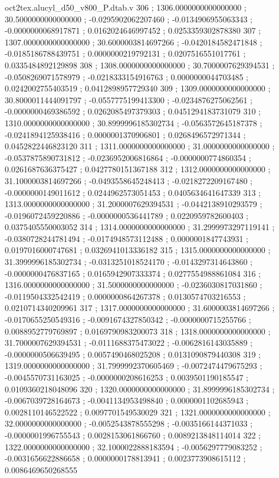 \begin{filecontents}[overwrite]{oct2tex.alucyl_d50_v800_P.dtab.v}
306 ; 1306.0000000000000000 ; 30.5000000000000000 ; -0.0295902062207460 ; -0.0134906955063343 ; -0.0000000068917871 ; 0.0162024646997452 ; 0.0253359302878380
307 ; 1307.0000000000000000 ; 30.6000003814697266 ; -0.0420184582471848 ; -0.0185186788439751 ; 0.0000000219792131 ; 0.0207516551017761 ; 0.0335484892129898
308 ; 1308.0000000000000000 ; 30.7000007629394531 ; -0.0508269071578979 ; -0.0218333154916763 ; 0.0000000044703485 ; 0.0242002755403519 ; 0.0412898957729340
309 ; 1309.0000000000000000 ; 30.8000011444091797 ; -0.0557775199413300 ; -0.0234876275062561 ; -0.0000000469386592 ; 0.0262085497379303 ; 0.0451294183731079
310 ; 1310.0000000000000000 ; 30.8999996185302734 ; -0.0563572645187378 ; -0.0241894125938416 ; 0.0000001370906801 ; 0.0268496572971344 ; 0.0452822446823120
311 ; 1311.0000000000000000 ; 31.0000000000000000 ; -0.0537875890731812 ; -0.0236952006816864 ; -0.0000000774860354 ; 0.0261687636375427 ; 0.0427780151367188
312 ; 1312.0000000000000000 ; 31.1000003814697266 ; -0.0493558645248413 ; -0.0218272209167480 ; -0.0000000149011612 ; 0.0244962573051453 ; 0.0405634641647339
313 ; 1313.0000000000000000 ; 31.2000007629394531 ; -0.0442138910293579 ; -0.0196072459220886 ; -0.0000000536441789 ; 0.0220959782600403 ; 0.0375405550003052
314 ; 1314.0000000000000000 ; 31.2999973297119141 ; -0.0380728244781494 ; -0.0174948573112488 ; 0.0000001847743931 ; 0.0197016000747681 ; 0.0326941013336182
315 ; 1315.0000000000000000 ; 31.3999996185302734 ; -0.0313251018524170 ; -0.0143297314643860 ; -0.0000000476837165 ; 0.0165942907333374 ; 0.0277554988861084
316 ; 1316.0000000000000000 ; 31.5000000000000000 ; -0.0236030817031860 ; -0.0119504332542419 ; 0.0000000864267378 ; 0.0130574703216553 ; 0.0210714340209961
317 ; 1317.0000000000000000 ; 31.6000003814697266 ; -0.0170655250549316 ; -0.0091674327850342 ; -0.0000000715255766 ; 0.0088952779769897 ; 0.0169790983200073
318 ; 1318.0000000000000000 ; 31.7000007629394531 ; -0.0111688375473022 ; -0.0062816143035889 ; -0.0000000506639495 ; 0.0057490468025208 ; 0.0131090879440308
319 ; 1319.0000000000000000 ; 31.7999992370605469 ; -0.0072474479675293 ; -0.0045570731163025 ; -0.0000000208616253 ; 0.0039501190185547 ; 0.0109360218048096
320 ; 1320.0000000000000000 ; 31.8999996185302734 ; -0.0067039728164673 ; -0.0041134953498840 ; 0.0000001102685943 ; 0.0028110146522522 ; 0.0097701549530029
321 ; 1321.0000000000000000 ; 32.0000000000000000 ; -0.0052543878555298 ; -0.0035166144371033 ; -0.0000001996755543 ; 0.0028153061866760 ; 0.0089213848114014
322 ; 1322.0000000000000000 ; 32.1000022888183594 ; -0.0056297779083252 ; -0.0031656622886658 ; 0.0000000178813941 ; 0.0023773908615112 ; 0.0086469650268555

\end{filecontents}
